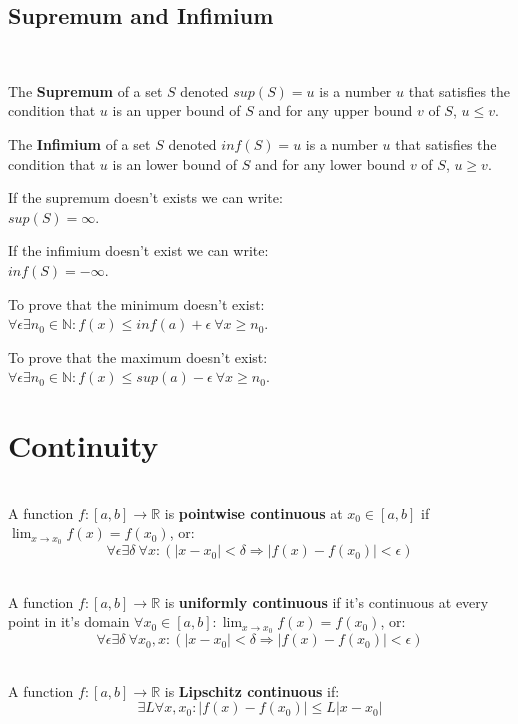 \documentclass[8pt,a4paper]{extarticle}     %
\theoremstyle{definition}
\theoremstyle{definition}
\theoremstyle{definition}
\newcommand{\R}{\mathbb{R}}
\newcommand{\N}{\mathbb{N}}
\begin{document}
\begin{multicols}{4}
\subsection{Supremum and Infimium}
\begin{boxdefinition} 
	\
	\begin{bulletlist}
		\item The \textbf{Supremum} of a set $S$ denoted $sup(S) = u$ is a number $u$ that satisfies the condition that $u$ is an upper bound of $S$ and for any upper bound $v$ of $S$, $u\leq v$.
		\item The \textbf{Infimium} of a set $S$ denoted $inf(S) = u$ is a number $u$ that satisfies the condition that $u$ is an lower bound of $S$ and for any lower bound $v$ of $S$, $u\geq v$.
	\end{bulletlist}
\end{boxdefinition}
\begin{bulletlist}
	\item If the supremum doesn't exists we can write:\\ $sup(S) = \infty$.
	\item If the infimium doesn't exist we can write:\\ $inf(S) = -\infty$.
	\item To prove that the minimum doesn't exist: \\ $\forall \epsilon \exists n_0 \in \N: f(x) \leq inf(a) + \epsilon \  \forall x \geq n_0$.
	\item To prove that the maximum doesn't exist: \\ $\forall \epsilon \exists n_0 \in \N: f(x) \leq sup(a) - \epsilon \  \forall x \geq n_0$.
\end{bulletlist}

\vfill\null
\columnbreak
\section{Continuity}
\begin{boxdefinition} \ \\ 
	A function $f:[a,b]\rightarrow\R$ is \textbf{pointwise continuous} at $x_0\in[a,b]$ if $\lim_{x\to x_0}f(x) = f(x_0)$, or:
	$$\forall \epsilon \exists \delta \ \forall x : (|x-x_0| < \delta \Rightarrow |f(x)-f(x_0)| < \epsilon)$$
\end{boxdefinition}
\begin{boxdefinition} \ \\
	A function $f:[a,b]\rightarrow \R$ is \textbf{uniformly continuous} if it's continuous at every point in it's domain $\forall x_0 \in [a,b]: \lim_{x\to x_0}f(x) = f(x_0)$, or:
	$$\forall\epsilon\exists\delta \ \forall x_0, x: (|x-x_0| < \delta \Rightarrow |f(x)-f(x_0)| < \epsilon)$$
\end{boxdefinition}
\begin{boxdefinition} \ \\
	A function $f:[a,b]\rightarrow \R$ is \textbf{Lipschitz continuous} if:
	$$\exists L \forall x, x_0: |f(x)-f(x_0)| \leq L|x-x_0|$$ 
\end{boxdefinition}

\end{multicols}
\end{document}
